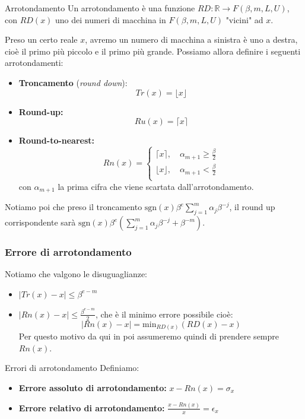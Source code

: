 \documentclass[a4paper,11pt]{article}
\begin{document}
\begin{definition}{Arrotondamento}
	Un arrotondamento è una funzione $RD: \mathbb{R} \rightarrow F(\beta, m, L, U)$, con $RD(x)$ uno dei numeri di macchina in $F(\beta, m, L, U)$ "vicini" ad $x$.
\end{definition}

Preso un certo reale $x$, avremo un numero di macchina a sinistra è uno a destra, cioè il primo più piccolo e il primo più grande.
Possiamo allora definire i seguenti arrotondamenti:
\begin{itemize}
	\item \textbf{Troncamento} (\textit{round down}): $$ Tr(x) = \lfloor x \rfloor $$
	\item \textbf{Round-up:} $$ Ru(x) = \lceil x \rceil$$
	\item \textbf{Round-to-nearest:} 
		$$
		Rn(x) =
			\begin{cases}
				\lceil x \rceil, \quad \alpha_{m + 1} \geq \frac{\beta}{2} \\ 
				\lfloor x \rfloor, \quad \alpha_{m + 1} < \frac{\beta}{2} \\ 
			\end{cases}
		$$
		con $\alpha_{m + 1}$ la prima cifra che viene scartata dall'arrotondamento. 
\end{itemize}

Notiamo poi che preso il troncamento $\mathrm{sgn}(x) \beta^e \sum_{j = 1}^{m} \alpha_j \beta^{-j}$, il round up corrispondente sarà $\mathrm{sgn}(x) \beta^e \left( \sum_{j = 1}^{m} \alpha_j \beta^{-j} + \beta^{-m}\right)$.

\subsubsection{Errore di arrotondamento}
Notiamo che valgono le disuguaglianze:
\begin{itemize}
	\item $ |Tr(x) - x| \leq \beta^{e - m} $ \\ 
	\item $ |Rn(x) - x| \leq \frac{\beta^{e - m}}{2} $, che è il minimo errore possibile cioè:
		$$
			|Rn(x) - x| = \mathrm{min}_{RD(x)}(RD(x) - x)
		$$
	Per questo motivo da qui in poi assumeremo quindi di prendere sempre $Rn(x)$.
\end{itemize}

\begin{definition}{Errori di arrotondamento}
	Definiamo:
	\begin{itemize}
		\item \textbf{Errore assoluto di arrotondamento:} $x - Rn(x) = \sigma_x$
		\item \textbf{Errore relativo di arrotondamento:} $\frac{x - Rn(x)}{x} = \epsilon_x$
	\end{itemize}
\end{definition}
\end{document}
